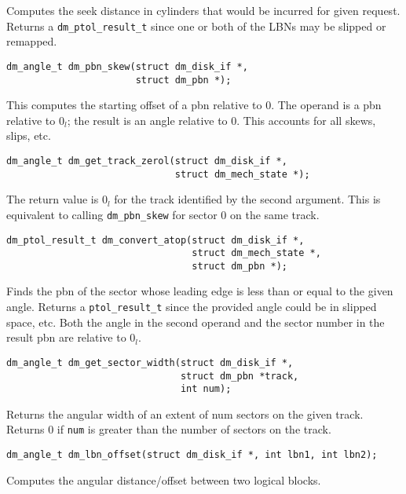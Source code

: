 Computes the seek distance in cylinders that would be incurred for
given request.  Returns a \texttt{dm\_ptol\_result\_t} since one or both of the
LBNs may be slipped or remapped.


\begin{verbatim}
dm_angle_t dm_pbn_skew(struct dm_disk_if *,
                       struct dm_pbn *);
\end{verbatim}

This computes the starting offset of a pbn relative to 0.  The operand
is a pbn relative to $0_l$; the result is an angle relative to $0$.
This accounts for all skews, slips, etc.

\begin{verbatim}
dm_angle_t dm_get_track_zerol(struct dm_disk_if *, 
                              struct dm_mech_state *);
\end{verbatim}

The return value is $0_l$ for the track identified by the second
argument.  This is equivalent to calling \texttt{dm\_pbn\_skew}
for sector 0 on the same track.


\begin{verbatim}
dm_ptol_result_t dm_convert_atop(struct dm_disk_if *,
                                 struct dm_mech_state *,
                                 struct dm_pbn *);
\end{verbatim}

Finds the pbn of the sector whose leading edge is less than or equal
to the given angle.  Returns a \texttt{ptol\_result\_t} since the
provided angle could be in slipped space, etc.  Both the angle in the
second operand and the sector number in the result pbn are relative to
$0_l$.



\begin{verbatim}
dm_angle_t dm_get_sector_width(struct dm_disk_if *,
                               struct dm_pbn *track,
                               int num);
\end{verbatim}

Returns the angular width of an extent of num sectors on the given track.
Returns 0 if \texttt{num} is greater than the number of sectors on the
track.

\begin{verbatim}
dm_angle_t dm_lbn_offset(struct dm_disk_if *, int lbn1, int lbn2);
\end{verbatim}

Computes the angular distance/offset between two logical blocks.



